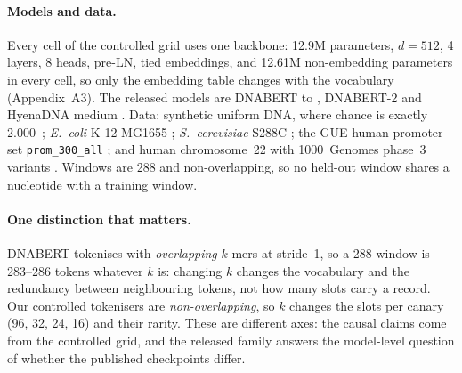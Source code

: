 \paragraph{Models and data.}
Every cell of the controlled grid uses one backbone: 12.9M parameters, $d=512$, 4 layers, 8 heads,
pre-LN, tied embeddings, and 12.61M non-embedding parameters in every cell, so only the embedding
table changes with the vocabulary (Appendix~A3). The released models are DNABERT  to
 \cite{ji2021dnabert}, DNABERT-2 \cite{zhou2024dnabert2} and HyenaDNA medium
\cite{nguyen2023hyenadna}. Data: synthetic uniform DNA, where chance is exactly 2.000~\bits;
\emph{E.~coli} K-12 MG1655 \cite{blattner1997ecoli}; \emph{S.~cerevisiae} S288C
\cite{engel2014yeast}; the GUE human promoter set \texttt{prom\_300\_all} \cite{zhou2024dnabert2};
and human chromosome~22 with 1000~Genomes phase~3 variants \cite{thousandgenomes2015}. Windows are
288\nt{} and non-overlapping, so no held-out window shares a nucleotide with a training window.

\paragraph{One distinction that matters.}
DNABERT tokenises with \emph{overlapping} $k$-mers at stride~1, so a 288\nt{} window is 283--286
tokens whatever $k$ is: changing $k$ changes the vocabulary and the redundancy between neighbouring
tokens, not how many slots carry a record. Our controlled tokenisers are \emph{non-overlapping}, so
$k$ changes the slots per canary (96, 32, 24, 16) and their rarity. These are different axes: the
causal claims come from the controlled grid, and the released family answers the model-level
question of whether the published checkpoints differ.
